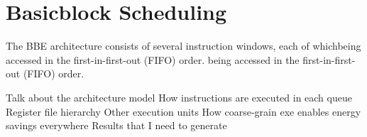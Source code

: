 \section{Basicblock Scheduling} 
\label{sec:bb_sch}


The BBE architecture consists of several instruction windows, each of whichbeing
accessed in the first-in-first-out (FIFO) order.  being accessed in the
first-in-first-out (FIFO) order.

Talk about the architecture model
How instructions are executed in each queue
Register file hierarchy
Other execution units
How coarse-grain exe enables energy savings everywhere
Results that I need to generate

